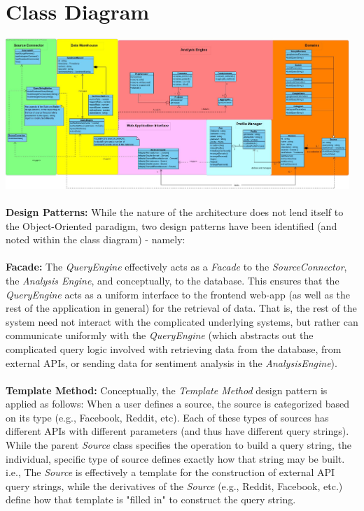 \documentclass[12pt]{article}
\begin{document}
\section{Class Diagram}

\includegraphics[width=13cm]{../../Images/classDiagram2.jpg}\\\\
\textbf{Design Patterns:} While the nature of the architecture does not lend itself to the Object-Oriented paradigm, two design patterns have been identified (and noted within the class diagram) - namely:\\\\
\textbf{Facade:} The \textit{QueryEngine} effectively acts as a \textit{Facade} to the \textit{SourceConnector}, the \textit{Analysis Engine}, and conceptually, to the database. This ensures that the \textit{QueryEngine} acts as a uniform interface to the frontend web-app (as well as the rest of the application in general) for the retrieval of data. That is, the rest of the system need not interact with the complicated underlying systems, but rather can communicate uniformly with the \textit{QueryEngine} (which abstracts out the complicated query logic involved with retrieving data from the database, from external APIs, or sending data for sentiment analysis in the \textit{AnalysisEngine}).\\\\
\textbf{Template Method:} Conceptually, the \textit{Template Method} design pattern is applied as follows: When a user defines a source, the source is categorized based on its type (e.g., Facebook, Reddit, etc). Each of these types of sources has different APIs with different parameters (and thus have different query strings). While the parent \textit{Source} class specifies the operation to build a query string, the individual, specific type of source defines exactly how that string may be built. i.e., The \textit{Source} is effectively a template for the construction of external API query strings, while the derivatives of the \textit{Source} (e.g., Reddit, Facebook, etc.) define how that template is "filled in" to construct the query string.
\end{document}
